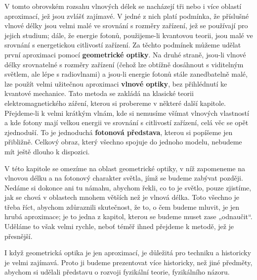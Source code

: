     V tomto obrovském rozsahu vlnových délek se nacházejí tři nebo i více oblastí aproximací, jež 
    jsou zvlášť zajímavé. V jedné z nich platí podmínka, že příslušné vlnové délky jsou velmi malé 
    ve srovnání s rozměry zařízení, jež se používají pro jejich studium; dále, že energie fotonů, 
    použijeme-li kvantovou teorii, jsou malé ve srovnání s energetickou citlivostí zařízení. Za 
    těchto podmínek můžeme udělat první aproximaci pomocí \textbf{geometrické optiky}. Na druhé 
    straně, jsou-li vlnové délky srovnatelné s rozměry zařízení (čehož lze obtížně dosáhnout s 
    viditelným světlem, ale lépe s radiovlnami) a jsou-li energie fotonů stále zanedbatelně malé, 
    lze použít velmi užitečnou aproximaci \textbf{vlnové optiky}, bez přihlédnutí ke kvantové 
    mechanice. Tato metoda se zakládá na klasické teorii elektromagnetického záření, kterou si 
    probereme v některé další kapitole. Přejdeme-li k velmi krátkým vlnám, kde si nemusíme všímat 
    vlnových vlastností a kde fotony mají velkou energii ve srovnání s citlivostí zařízení, celá 
    věc se opět zjednoduší. To je jednoduchá \textbf{fotonová představa}, kterou si popíšeme jen 
    přibližně. Celkový obraz, který všechno spojuje do jednoho modelu, nebudeme mít ještě dlouho k 
    dispozici.
    
    V této kapitole se omezíme na oblast geometrické optiky, v níž zapomeneme na vlnovou délku a na 
    fotonový charakter světla, jímž se budeme zabývat později. Nedáme si dokonce ani tu námahu, 
    abychom řekli, co to je světlo, pouze zjistíme, jak se chová v oblastech mnohem větších než je 
    vlnová délka. Toto všechno je třeba říct, abychom zdůraznili skutečnost, že to, o čem budeme 
    mluvit, je jen hrubá aproximace; je to jedna z kapitol, kterou se budeme muset zase „odnaučit“. 
    Uděláme to však velmi rychle, neboť téměř ihned přejdeme k metodě, jež je přesnější.
    
    I když geometrická optika je jen aproximací, je důležitá pro techniku a historicky je velmi 
    zajímavá. Proto ji budeme prezentovat více historicky, než jiné předměty, abychom si udělali 
    představu o rozvoji fyzikální teorie, fyzikálního názoru.
    
